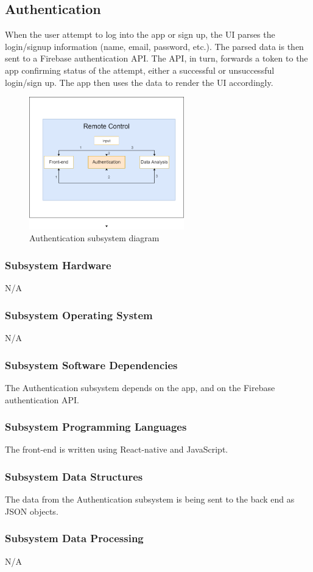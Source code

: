 \subsection{Authentication}
When the user attempt to log into the app or sign up, the UI parses the login/signup information (name, email, password, etc.). The parsed data is then sent to a Firebase authentication API. The API, in turn, forwards a token to the app confirming status of the attempt, either a successful or unsuccessful login/sign up. The app then uses the data to render the UI accordingly.

\begin{figure}[h!]
	\centering
 	\includegraphics[width=0.60\textwidth]{images/Authentication.png} %
 \caption{Authentication subsystem diagram} %
\end{figure}

\subsubsection{Subsystem Hardware}
N/A

\subsubsection{Subsystem Operating System}
N/A

\subsubsection{Subsystem Software Dependencies}
The Authentication subsystem depends on the app, and on the Firebase authentication API.

\subsubsection{Subsystem Programming Languages}
The front-end is written using React-native and JavaScript.

\subsubsection{Subsystem Data Structures}
The data from the Authentication subsystem is being sent to the back end as JSON objects.

\subsubsection{Subsystem Data Processing}
N/A
